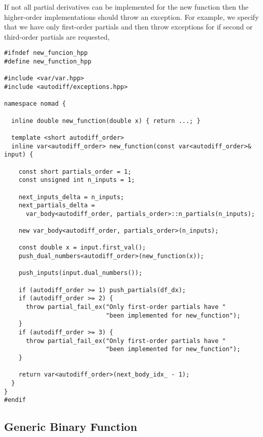 If not all partial derivatives can be implemented for the new function then the
higher-order implementations should throw an exception.  For example, we
specify that we have only first-order partials and then throw exceptions for
if second or third-order partials are requested,
%
\begin{verbatim}
#ifndef new_funcion_hpp
#define new_function_hpp

#include <var/var.hpp>
#include <autodiff/exceptions.hpp>

namespace nomad {

  inline double new_function(double x) { return ...; }
  
  template <short autodiff_order>
  inline var<autodiff_order> new_function(const var<autodiff_order>& input) {
    
    const short partials_order = 1;
    const unsigned int n_inputs = 1;
    
    next_inputs_delta = n_inputs;
    next_partials_delta =
      var_body<autodiff_order, partials_order>::n_partials(n_inputs);
    
    new var_body<autodiff_order, partials_order>(n_inputs);

    const double x = input.first_val();
    push_dual_numbers<autodiff_order>(new_function(x));
    
    push_inputs(input.dual_numbers());
    
    if (autodiff_order >= 1) push_partials(df_dx);
    if (autodiff_order >= 2) {
      throw partial_fail_ex("Only first-order partials have "
                            "been implemented for new_function");
    }
    if (autodiff_order >= 3) {
      throw partial_fail_ex("Only first-order partials have "
                            "been implemented for new_function");
    }

    return var<autodiff_order>(next_body_idx_ - 1);
  }
}
#endif
\end{verbatim}

\subsection{Generic Binary Function}

